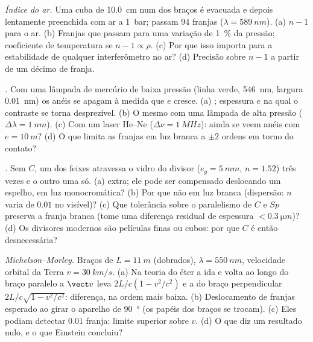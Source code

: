 \begin{exercise}[$\star\star$]\label{exo:b2:michelson:6}
\emph{Índice do ar.} Uma cuba de \qty{10.0}{cm} num dos braços é evacuada e depois
lentamente preenchida com ar a \qty{1}{bar}; passam $94$ franjas ($\lambda = \qty{589}{nm}$).
(a) $n - 1$ para o ar. (b) Franjas que passam para uma variação de \qty{1}{\%} da
pressão; coeficiente de temperatura se $n - 1 \propto \rho$. (c) Por que isso
importa para a estabilidade de qualquer interferômetro no ar? (d) Precisão sobre
$n - 1$ a partir de um décimo de franja.
\end{exercise}

\begin{exercise}[$\star\star$]\label{exo:b2:michelson:7}
\emph{.} Com uma lâmpada de mercúrio de baixa pressão (linha verde,
\qty{546}{nm}, largura \qty{0.01}{nm}) os anéis se apagam à medida que $e$ cresce. (a) ; espessura $e$ na qual o contraste se torna desprezível. (b) O mesmo
com uma lâmpada de alta pressão ($\Delta\lambda = \qty{1}{nm}$). (c) Com um laser He--Ne
($\Delta\nu = \qty{1}{MHz}$): ainda se veem anéis com $e = \qty{10}{m}$? (d) O que
limita as franjas em luz branca a $\pm2$ ordens em torno do contato?
\end{exercise}

\begin{exercise}[$\star\star$]\label{exo:b2:michelson:8}
\emph{.} Sem $C$, um dos feixes atravessa o vidro do
divisor ($e_g = \qty{5}{mm}$, $n = 1.52$) três vezes e o outro uma só. (a)
 extra; ele pode ser compensado deslocando um espelho, em
luz monocromática? (b) Por que não em luz branca (dispersão: $n$
varia de $0.01$ no visível)? (c) Que tolerância sobre o
paralelismo de $C$ e $Sp$ preserva a franja branca (tome uma diferença
residual de espessura $< \qty{0.3}{\micro m}$)? (d) Os divisores modernos são
películas finas ou cubos: por que $C$ é então desnecessária?
\end{exercise}

\begin{exercise}[$\star\star$]\label{exo:b2:michelson:9}
\emph{Michelson--Morley.} Braços de $L = \qty{11}{m}$ (dobrados), $\lambda = \qty{550}{nm}$,
velocidade orbital da Terra $v = \qty{30}{km/s}$. (a) Na teoria do éter a
ida e volta ao longo do braço paralelo a $\vect v$ leva $2L/c(1 - v^2/c^2)$
e a do braço perpendicular $2L/c\sqrt{1 - v^2/c^2}$: diferença, na ordem mais
baixa. (b) Deslocamento de franjas esperado ao girar o aparelho de \qty{90}{\degree}
(os papéis dos braços se trocam). (c) Eles podiam detectar $0.01$ franja: limite
superior sobre $v$. (d) O que diz um resultado nulo, e o que Einstein
concluiu?
\end{exercise}


